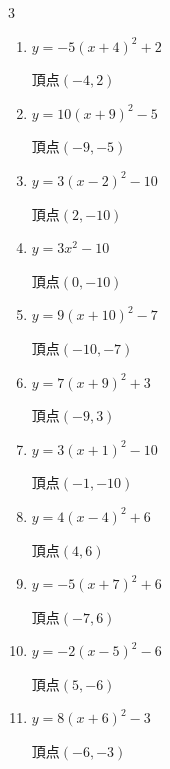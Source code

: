 \begin{multicols}{3}
\begin{enumerate}
        $\displaystyle 頂点\left( 1 , 4 \right)$

  \item $\displaystyle y=-5\left( x+4\right)^{2}+2$

        $\displaystyle 頂点\left( -4 , 2 \right)$

  \item $\displaystyle y=10\left( x+9\right)^{2}-5$

        $\displaystyle 頂点\left( -9 , -5 \right)$

  \item $\displaystyle y=3\left( x-2\right)^{2}-10$

        $\displaystyle 頂点\left( 2 , -10 \right)$

  \item $\displaystyle y=3x^{2}-10$

        $\displaystyle 頂点\left( 0 , -10 \right)$

  \item $\displaystyle y=9\left( x+10\right)^{2}-7$

        $\displaystyle 頂点\left( -10 , -7 \right)$

  \item $\displaystyle y=7\left( x+9\right)^{2}+3$

        $\displaystyle 頂点\left( -9 , 3 \right)$

  \item $\displaystyle y=3\left( x+1\right)^{2}-10$

        $\displaystyle 頂点\left( -1 , -10 \right)$

\columnbreak %

  \item $\displaystyle y=4\left( x-4\right)^{2}+6$

        $\displaystyle 頂点\left( 4 , 6 \right)$

  \item $\displaystyle y=-5\left( x+7\right)^{2}+6$

        $\displaystyle 頂点\left( -7 , 6 \right)$

  \item $\displaystyle y=-2\left( x-5\right)^{2}-6$

        $\displaystyle 頂点\left( 5 , -6 \right)$

  \item $\displaystyle y=8\left( x+6\right)^{2}-3$

        $\displaystyle 頂点\left( -6 , -3 \right)$


\end{enumerate}
\end{multicols}
